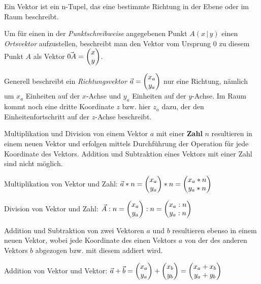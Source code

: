 




Ein Vektor ist ein n-Tupel, das eine bestimmte Richtung in der Ebene oder im Raum beschreibt.


Um f\"{u}r einen in der \emph{Punktschreibweise} angegebenen Punkt $A (x\, |\, y)$ einen \emph{Ortsvektor} aufzustellen, beschreibt man den Vektor vom Ursprung $0$ zu diesem Punkt $A$ als Vektor $\vec{0A} = \begin{pmatrix}x\\y\end{pmatrix}$.

Generell beschreibt ein \emph{Richtungsvektor} $\vec{a} = \begin{pmatrix}x_{a} \\ y_{a}\end{pmatrix}$ nur eine Richtung, n\"{a}mlich um $x_{a}$ Einheiten auf der $x$-Achse und $y_{a}$ Einheiten auf der $y$-Achse. Im Raum kommt noch eine dritte Koordinate $z$ bzw. hier $z_{a}$ dazu, der den Einheitenfortschritt auf der $z$-Achse beschreibt.



Multiplikation und Division von einem Vektor $a$ mit einer \textbf{Zahl} $n$ resultieren in einem neuen Vektor und erfolgen mittels Durchf\"{u}hrung der Operation f\"{u}r jede Koordinate des Vektors. Addition und Subtraktion eines Vektors mit einer Zahl sind nicht m\"{o}glich.

Multiplikation von Vektor und Zahl: $ \vec{a} * n = \begin{pmatrix}x_{a}\\y_{a}\end{pmatrix} * n  = \begin{pmatrix}x_{a} * n \\ y_{a} * n\end{pmatrix}$

Division von Vektor und Zahl: $ \vec{A} : n = \begin{pmatrix}x_{a}\\y_{a}\end{pmatrix} : n = \begin{pmatrix}x_{a} : n \\ y_{a} : n\end{pmatrix}$


Addition und Subtraktion von zwei Vektoren $a$ und $b$ resultieren ebenso in einem neuen Vektor, wobei jede Koordinate des einen Vektors $a$ von der des anderen Vektors $b$ abgezogen bzw. mit diesem addiert wird.

Addition von Vektor und Vektor: $\vec{a} + \vec{b} = \begin{pmatrix}x_{a}\\y_{a}\end{pmatrix} + \begin{pmatrix}x_{b}\\y_{b}\end{pmatrix} = \begin{pmatrix}x_{a} + x_{b} \\ y_{a} + y_{b}\end{pmatrix}$

